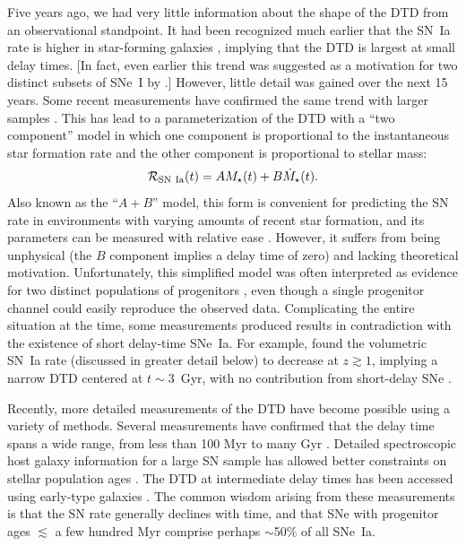 Five years ago, we had very little information about the shape of the
DTD from an observational standpoint. It had been recognized much
earlier that the SN~Ia rate is higher in star-forming galaxies
\citep{vandenbergh90a}, implying that the DTD is largest at small
delay times. [In fact, even earlier this trend was suggested as a
  motivation for two distinct subsets of SNe~I by
  \citet{dallaporta73a}.] However, little detail was gained over the
next 15 years. Some recent measurements have confirmed the same trend
with larger samples \citep{mannucci05a}. This has lead to a
parameterization of the DTD with a ``two component'' model
\citep{scannapieco05a} in which one component is proportional to the
instantaneous star formation rate and the other component is
proportional to stellar mass:
\begin{equation}
\mathcal{R}_{\rm SN~Ia} (t) = A M_\star (t) + B \dot{M}_\star(t).
\end{equation}
Also known as the ``$A+B$'' model, this form is convenient for
predicting the SN rate in environments with varying amounts of recent
star formation, and its parameters can be measured with relative ease
\citep[e.g.,][]{sullivan06a}. However, it suffers from being
unphysical (the $B$ component implies a delay time of zero) and
lacking theoretical motivation.  Unfortunately, this simplified model
was often interpreted as evidence for two distinct populations of
progenitors \citep[e.g.,][]{mannucci06a}, even though a single
progenitor channel could easily reproduce the observed
data. Complicating the entire situation at the time, some measurements
produced results in contradiction with the existence of short
delay-time SNe~Ia.  For example, \citet{dahlen04a} found the
volumetric SN~Ia rate (discussed in greater detail below) to decrease
at $z \gtrsim 1$, implying a narrow DTD centered at $t \sim 3$~Gyr,
with no contribution from short-delay SNe \citep{strolger04a}.

Recently, more detailed measurements of the DTD have become possible
using a variety of methods. Several measurements have confirmed that
the delay time spans a wide range, from less than 100 Myr
\citep[e.g.,][]{aubourg08a} to many Gyr
\citep[e.g.,][]{schawinski09a}. Detailed spectroscopic host galaxy
information for a large SN sample has allowed better constraints on
stellar population ages \citep{brandt10a}. The DTD at intermediate
delay times has been accessed using early-type galaxies
\citep{totani08a}. The common wisdom arising from these measurements
is that the SN rate generally declines with time, and that SNe with
progenitor ages $\lesssim$ a few hundred Myr comprise perhaps
$\sim$50\% of all SNe~Ia. 

